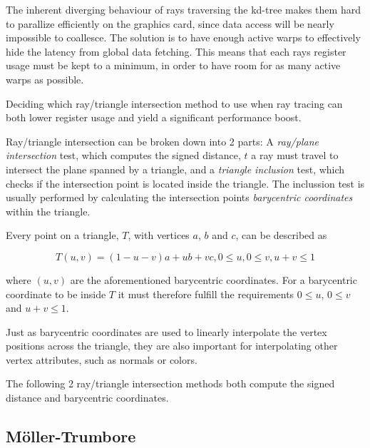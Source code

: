 The inherent diverging behaviour of rays traversing the kd-tree makes them hard
to parallize efficiently on the graphics card, since data access will be nearly
impossible to coallesce. The solution is to have enough active warps to
effectively hide the latency from global data fetching. This means that each
rays register usage must be kept to a minimum, in order to have room for as many
active warps as possible.

Deciding which ray/triangle intersection method to use when ray tracing can both
lower register usage and yield a significant performance boost.


Ray/triangle intersection can be broken down into 2 parts: A \textit{ray/plane
  intersection} test, which computes the signed distance, $t$ a ray must travel
to intersect the plane spanned by a triangle, and a \textit{triangle inclusion}
test, which checks if the intersection point is located inside the triangle. The
inclussion test is usually performed by calculating the intersection points
\textit{barycentric coordinates} within the triangle.

Every point on a triangle, $T$, with vertices $a$, $b$ and $c$, can be described
as

\begin{displaymath}
  T(u,v) = (1-u-v)a + ub + vc, 0 \le u, 0 \le v, u+v \le 1
\end{displaymath}
 
where $(u, v)$ are the aforementioned barycentric coordinates. For a barycentric
coordinate to be inside $T$ it must therefore fulfill the requirements $0 \le
u$, $0 \le v$ and $u+v \le 1$.

Just as barycentric coordinates are used to linearly interpolate the vertex
positions across the triangle, they are also important for interpolating other
vertex attributes, such as normals or colors.

The following 2 ray/triangle intersection methods both compute the signed
distance and barycentric coordinates.

\subsection{Möller-Trumbore}


